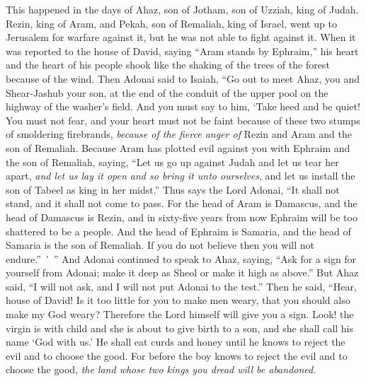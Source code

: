 \begin{biblechapter} %
 This happened in the days of Ahaz, son of Jotham, son of Uzziah, king of Judah. Rezin, king of Aram, and Pekah, son of Remaliah, king of Israel, went up to Jerusalem for warfare against it, but he was not able to fight against it.
\verse When it was reported to the house of David, saying “Aram stands by Ephraim,” his heart and the heart of his people shook like the shaking of the trees of the forest because of the wind.
\verse Then Adonai said to Isaiah, “Go out to meet Ahaz, you and Shear-Jashub your son, at the end of the conduit of the upper pool on the highway of the washer’s field.
\verse And you must say to him, ‘Take heed and be quiet! You must not fear, and your heart must not be faint because of these two stumps of smoldering firebrands, \textit{because of the fierce anger of} Rezin and Aram and the son of Remaliah.
\verse Because Aram has plotted evil against you with Ephraim and the son of Remaliah, saying,
\verse “Let us go up against Judah and let us tear her apart, \textit{and let us lay it open and so bring it unto ourselves}, and let us install the son of Tabeel as king in her midst.”
\verse Thus says the Lord Adonai, “It shall not stand, and it shall not come to pass.
\verse For the head of Aram is Damascus, and the head of Damascus is Rezin, and in sixty-five years from now Ephraim will be too shattered to be a people.
\verse And the head of Ephraim is Samaria, and the head of Samaria is the son of Remaliah. If you do not believe then you will not endure.” ’ ”
\verse And Adonai continued to speak to Ahaz, saying,
\verse “Ask for a sign for yourself from Adonai; make it deep as Sheol or make it high as above.”
\verse But Ahaz said, “I will not ask, and I will not put Adonai to the test.”
\verse Then he said, “Hear, house of David! Is it too little for you to make men weary, that you should also make my God weary?
\verse Therefore the Lord himself will give you a sign. Look! the virgin is with child and she is about to give birth to a son, and she shall call his name ‘God with us.’
\verse He shall eat curds and honey until he knows to reject the evil and to choose the good.
\verse For before the boy knows to reject the evil and to choose the good, \textit{the land whose two kings you dread will be abandoned.}

\end{biblechapter}
